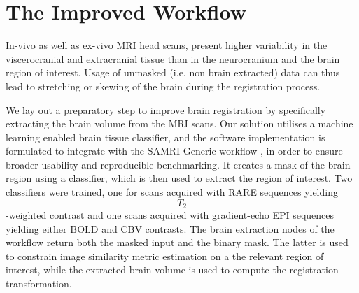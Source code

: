 \section{The Improved Workflow}

In-vivo as well as ex-vivo MRI head scans, present higher variability in the viscerocranial and extracranial tissue than in the neurocranium and the brain region of interest.
Usage of unmasked (i.e. non brain extracted) data can thus lead to stretching or skewing of the brain during the registration process.

We lay out a preparatory step to improve brain registration by specifically extracting the brain volume from the MRI scans.
Our solution utilises a machine learning enabled brain tissue classifier, and the software implementation is formulated to integrate with the SAMRI Generic workflow \cite{ioanas_optimized_2019}, in order to ensure broader usability and reproducible benchmarking.
It creates a mask of the brain region using a classifier, which is then used to extract the region of interest.
Two classifiers were trained, one for scans acquired with RARE sequences yielding $$T_2$$-weighted contrast and one scans acquired with gradient-echo EPI sequences yielding either BOLD \cite{bold} and CBV \cite{cbv} contrasts.
The brain extraction nodes of the workflow return both the masked input and the binary mask.
The latter is used to constrain image similarity metric estimation on a the relevant region of interest, while the extracted brain volume is used to compute the registration transformation.

